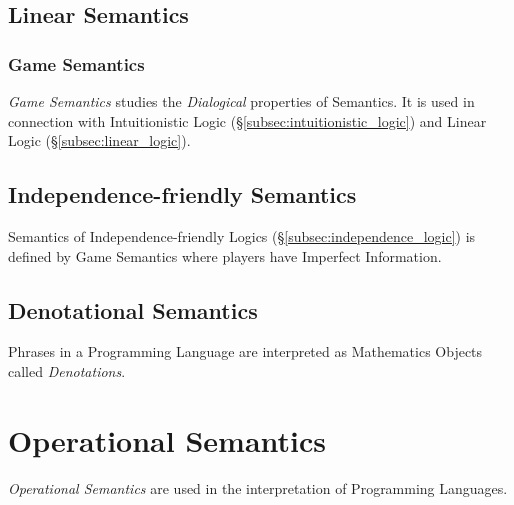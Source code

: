 \documentclass{article}
\begin{document}
\subsection{Linear Semantics}

\subsubsection{Game Semantics}

\emph{Game Semantics} studies the \emph{Dialogical} properties of
Semantics. It is used in connection with Intuitionistic Logic
(\S\ref{subsec:intuitionistic_logic}) and Linear Logic
(\S\ref{subsec:linear_logic}).

\subsection{Independence-friendly Semantics}

Semantics of Independence-friendly Logics
(\S\ref{subsec:independence_logic}) is defined by Game Semantics where
players have Imperfect Information.

\subsection{Denotational Semantics}

Phrases in a Programming Language are interpreted as Mathematics
Objects called \emph{Denotations}.

\section{Operational Semantics}

\emph{Operational Semantics} are used in the interpretation of
Programming Languages.
\end{document}
